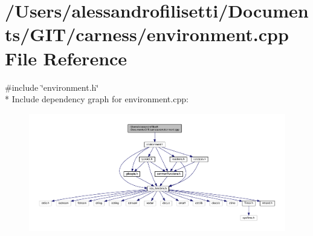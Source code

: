 \hypertarget{a00061}{\section{/\+Users/alessandrofilisetti/\+Documents/\+G\+I\+T/carness/environment.cpp File Reference}
\label{a00061}
}
{\ttfamily \#include \char`\"{}environment.\+h\char`\"{}}\\*
Include dependency graph for environment.\+cpp\+:\nopagebreak
\begin{figure}[H]
\begin{center}
\leavevmode
\includegraphics[width=350pt]{a00179}
\end{center}
\end{figure}
